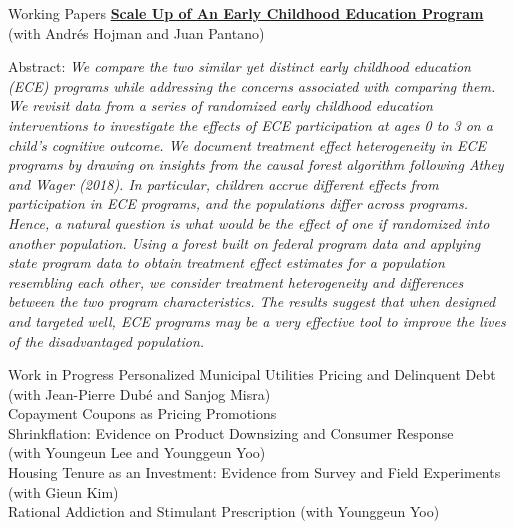 \documentclass{resume} %
\begin{document}
\begin{rSection}{Working Papers}
		\href{chanwoolkim.github.io}{\textbf{Scale Up of An Early Childhood Education Program}} \\ (with Andr\'es Hojman and Juan Pantano)
		
		Abstract: \textit{We compare the two similar yet distinct early childhood education (ECE) programs while addressing the concerns associated with comparing them. We revisit data from a series of randomized early childhood education interventions to investigate the effects of ECE participation at ages 0 to 3 on a child's cognitive outcome. We document treatment effect heterogeneity in ECE programs by drawing on insights from the causal forest algorithm following Athey and Wager (2018). In particular, children accrue different effects from participation in ECE programs, and the populations differ across programs. Hence, a natural question is what would be the effect of one if randomized into another population. Using a forest built on federal program data and applying state program data to obtain treatment effect estimates for a population resembling each other, we consider treatment heterogeneity and differences between the two program characteristics. The results suggest that when designed and targeted well, ECE programs may be a very effective tool to improve the lives of the disadvantaged population.}
	\end{rSection}
	
	\begin{rSection}{Work in Progress}
		Personalized Municipal Utilities Pricing and Delinquent Debt (with Jean-Pierre Dub\'e and Sanjog Misra) \\
		Copayment Coupons as Pricing Promotions \\
		Shrinkflation: Evidence on Product Downsizing and Consumer Response \\ (with Youngeun Lee and Younggeun Yoo) \\
		Housing Tenure as an Investment: Evidence from Survey and Field Experiments (with Gieun Kim) \\
		Rational Addiction and Stimulant Prescription (with Younggeun Yoo)
	\end{rSection}
\end{document}
